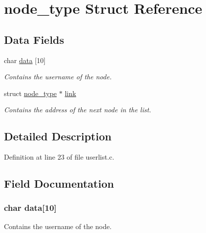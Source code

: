 \hypertarget{structnode__type}{\section{node\-\_\-type \-Struct \-Reference}
\label{structnode__type}
}
\subsection*{\-Data \-Fields}
\begin{DoxyCompactItemize}
\item 
char \hyperlink{structnode__type_ab7d1b21df4e1e043d82a65f6714f3916}{data} \mbox{[}10\mbox{]}
\begin{DoxyCompactList}\small\item\em \-Contains the username of the node. \end{DoxyCompactList}\item 
struct \hyperlink{structnode__type}{node\-\_\-type} $\ast$ \hyperlink{structnode__type_a652e8eeb6cbe57963572cc868faae1d0}{link}
\begin{DoxyCompactList}\small\item\em \-Contains the address of the next node in the list. \end{DoxyCompactList}\end{DoxyCompactItemize}


\subsection{\-Detailed \-Description}


\-Definition at line 23 of file userlist.\-c.



\subsection{\-Field \-Documentation}
\hypertarget{structnode__type_ab7d1b21df4e1e043d82a65f6714f3916}{
\subsubsection[{data}]{\setlength{\rightskip}{0pt plus 5cm}char {\bf data}\mbox{[}10\mbox{]}}}\label{structnode__type_ab7d1b21df4e1e043d82a65f6714f3916}


\-Contains the username of the node. 



